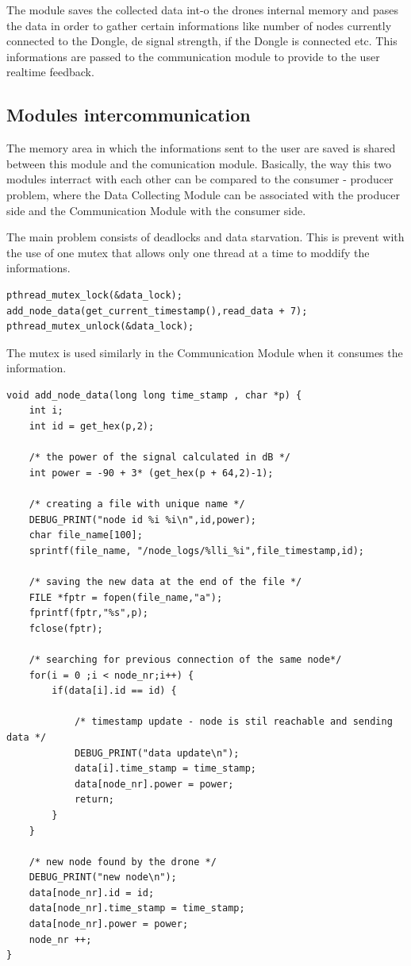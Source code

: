 The module saves the collected data int-o the drones internal memory and pases the data in order to gather certain informations like number of nodes currently connected to the Dongle, de signal strength, if the Dongle is connected etc. This informations are passed to the communication module to provide to the user realtime feedback.


\subsection{Modules intercommunication}

The memory area in which the informations sent to the user are saved is shared between this module and the comunication module. Basically, the way this two modules interract with each other can be compared to the consumer - producer problem, where the Data Collecting Module can be associated with the producer side and the Communication Module with the consumer side.

The main problem consists of deadlocks and data starvation. This is prevent with the use of one mutex that allows only one thread at a time to moddify the informations.

\lstset{numbers=none, mathescape=true, nolol=false,caption=Data Collection use of mutex,label=lst:task}
\begin{lstlisting}
pthread_mutex_lock(&data_lock); 
add_node_data(get_current_timestamp(),read_data + 7);
pthread_mutex_unlock(&data_lock);
\end{lstlisting}

The mutex is used similarly in the Communication Module when it consumes the information.

\lstset{numbers=none, mathescape=true, nolol=false,caption=Data Collection use of mutex,label=lst:task}
\begin{lstlisting}
void add_node_data(long long time_stamp , char *p) {
	int i;
	int id = get_hex(p,2);

	/* the power of the signal calculated in dB */
	int power = -90 + 3* (get_hex(p + 64,2)-1);

	/* creating a file with unique name */
	DEBUG_PRINT("node id %i %i\n",id,power);
	char file_name[100];
	sprintf(file_name, "/node_logs/%lli_%i",file_timestamp,id);

	/* saving the new data at the end of the file */
	FILE *fptr = fopen(file_name,"a");	
	fprintf(fptr,"%s",p);
	fclose(fptr);
	
	/* searching for previous connection of the same node*/
	for(i = 0 ;i < node_nr;i++) {
		if(data[i].id == id) {

			/* timestamp update - node is stil reachable and sending data */
			DEBUG_PRINT("data update\n");
			data[i].time_stamp = time_stamp;
			data[node_nr].power = power;
			return;
		}
	}
	
	/* new node found by the drone */
	DEBUG_PRINT("new node\n");
	data[node_nr].id = id;
	data[node_nr].time_stamp = time_stamp;
	data[node_nr].power = power;
	node_nr ++;
}

\end{lstlisting}



